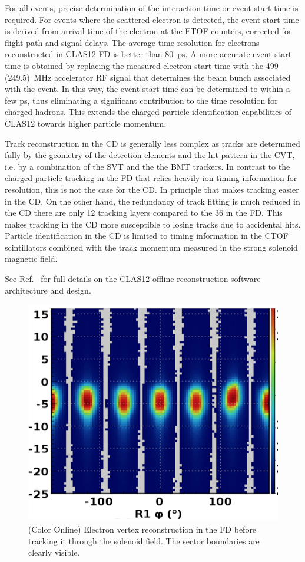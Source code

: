 \documentclass[final,3p,twocolumn]{elsarticle}
\begin{document}
For all events, precise determination of the interaction time or event start time is required. For events where the
scattered electron is detected, the event start time is derived from arrival time of the electron at the FTOF counters, 
corrected for flight path and signal delays.  The average time resolution for electrons reconstructed in CLAS12 FD is
better than 80~ps. A more accurate event start time is obtained by replacing the measured electron start time with the
499 (249.5)~MHz accelerator RF signal that determines the beam bunch associated with the event. In this way, the event
start time can be determined to within a few ps, thus eliminating a significant contribution to the time resolution for
charged hadrons. This extends the charged particle identification capabilities of CLAS12 towards higher particle
momentum.

Track reconstruction in the CD is generally less complex as tracks are determined fully by the geometry of the 
detection elements and the hit pattern in the CVT, i.e. by a combination of the SVT and the the BMT trackers. 
In contrast to the charged particle tracking in the FD that relies heavily ion timing information for resolution, 
this is not the case for the CD. In principle that makes tracking easier in the CD. On the other hand, the redundancy 
of track fitting is much reduced in the CD there are only 12 tracking layers compared to the 36 in the FD. This 
makes tracking in the CD more susceptible to losing tracks due to accidental hits. Particle identification in the CD is
limited to timing information in the CTOF scintillators combined with the track momentum measured in the strong solenoid 
magnetic field.  

See Ref.~\cite{Software} for full details on the CLAS12 offline reconstruction software architecture and design.

\begin{figure}[htbp!]
\includegraphics[width=0.96\columnwidth]{R1-vertex.png}
\caption{(Color Online) Electron vertex reconstruction in the FD before tracking it through the solenoid field. 
The sector boundaries are clearly visible.} 
\label{vertex}
\end{figure}
\end{document}
